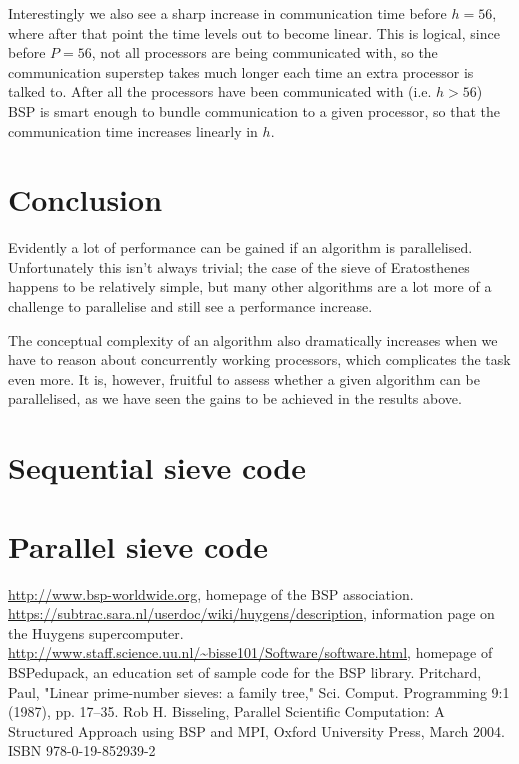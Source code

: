 \documentclass[a4paper]{article}
\begin{document}
Interestingly we also see a sharp increase in communication time before $h=56$,
where after that point the time levels out to become linear. This is logical,
since before $P=56$, not all processors are being communicated with, so the
communication superstep takes much longer each time an extra processor is talked
to. After all the processors have been communicated with (i.e. $h>56$) BSP is
smart enough to bundle communication to a given processor, so that the
communication time increases linearly in $h$. 

\section{Conclusion}

Evidently a lot of performance can be gained if an algorithm is parallelised.
Unfortunately this isn't always trivial; the case of the sieve of Eratosthenes
happens to be relatively simple, but many other algorithms are a lot more of a
challenge to parallelise and still see a performance increase. 

The conceptual complexity of an algorithm also dramatically increases when we
have to reason about concurrently working processors, which complicates the task
even more. It is, however, fruitful to assess whether a given algorithm can be
parallelised, as we have seen the gains to be achieved in the results above. 

\appendix
\section{Sequential sieve code}\label{app:seq}


\section{Parallel sieve code}\label{app:par}



\begin{thebibliography}{99}
     \url{http://www.bsp-worldwide.org}, homepage of the BSP
        association. 
        \url{https://subtrac.sara.nl/userdoc/wiki/huygens/description},
        information page on the Huygens supercomputer. 
        \url{http://www.staff.science.uu.nl/~bisse101/Software/software.html}, homepage of BSPedupack, an education set of sample code for the
        BSP library. 
     Pritchard, Paul, "Linear prime-number sieves: a family tree," Sci. Comput. Programming 9:1 (1987), pp. 17–35.
     Rob H. Bisseling, Parallel Scientific Computation: A Structured Approach using BSP and MPI, Oxford University Press, March 2004. ISBN 978-0-19-852939-2
\end{thebibliography}
\end{document}
